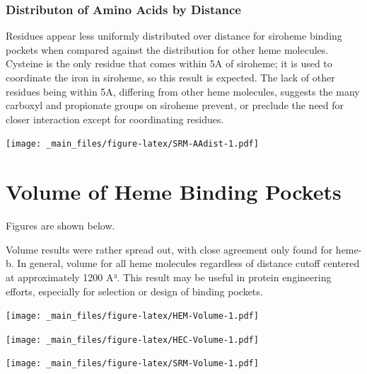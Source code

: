 \documentclass[a4paper, nobind]{templates/ociamthesis}
\let\origfigure\figure
\let\endorigfigure\endfigure
\renewenvironment{figure}[1][2] {
    \expandafter\origfigure\expandafter[H]
} {
    \endorigfigure
}
\begin{document}
\hypertarget{distributon-of-amino-acids-by-distance-3}{%
\subsubsection{Distributon of Amino Acids by Distance}\label{distributon-of-amino-acids-by-distance-3}}

Residues appear less uniformly distributed over distance for siroheme binding pockets when compared against the distribution for other heme molecules. Cysteine is the only residue that comes within 5A of siroheme; it is used to coordinate the iron in siroheme, so this result is expected. The lack of other residues being within 5A, differing from other heme molecules, suggests the many carboxyl and propionate groups on siroheme prevent, or preclude the need for closer interaction except for coordinating residues.

\begin{figure}
\centering
\texttt{[image: \_main\_files/figure-latex/SRM-AAdist-1.pdf]}
\caption{\label{fig:SRM-AAdist}SRM: Residue Distribution by Distance}
\end{figure}

\hypertarget{volume-of-heme-binding-pockets}{%
\section{Volume of Heme Binding Pockets}\label{volume-of-heme-binding-pockets}}

Figures are shown below.

Volume results were rather spread out, with close agreement only found for heme-b. In general, volume for all heme molecules regardless of distance cutoff centered at approximately 1200 A³. This result may be useful in protein engineering efforts, especially for selection or design of binding pockets.

\begin{figure}
\centering
\texttt{[image: \_main\_files/figure-latex/HEM-Volume-1.pdf]}
\caption{\label{fig:HEM-Volume}HEM: Volume of Binding Pocket}
\end{figure}

\begin{figure}
\centering
\texttt{[image: \_main\_files/figure-latex/HEC-Volume-1.pdf]}
\caption{\label{fig:HEC-Volume}HEC: Volume of Binding Pocket}
\end{figure}

\begin{figure}
\centering
\texttt{[image: \_main\_files/figure-latex/SRM-Volume-1.pdf]}
\caption{\label{fig:SRM-Volume}SRM: Volume of Binding Pocket}
\end{figure}
\end{document}
